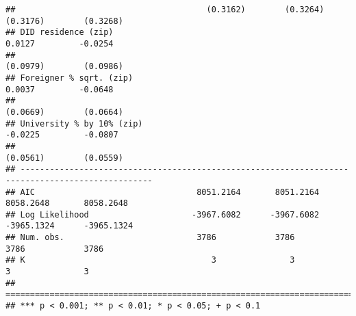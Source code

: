 \documentclass[
]{article}
\begin{document}
\begin{verbatim}
##                                       (0.3162)        (0.3264)        (0.3176)        (0.3268)   
## DID residence (zip)                                                    0.0127         -0.0254    
##                                                                       (0.0979)        (0.0986)   
## Foreigner % sqrt. (zip)                                                0.0037         -0.0648    
##                                                                       (0.0669)        (0.0664)   
## University % by 10% (zip)                                             -0.0225         -0.0807    
##                                                                       (0.0561)        (0.0559)   
## -------------------------------------------------------------------------------------------------
## AIC                                 8051.2164       8051.2164       8058.2648       8058.2648    
## Log Likelihood                     -3967.6082      -3967.6082      -3965.1324      -3965.1324    
## Num. obs.                           3786            3786            3786            3786         
## K                                      3               3               3               3         
## =================================================================================================
## *** p < 0.001; ** p < 0.01; * p < 0.05; + p < 0.1
\end{verbatim}
\end{document}
